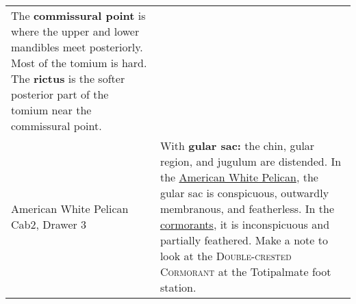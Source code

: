 \documentclass[10pt]{article}
\newif\ifprintkey
\newcommand{\PrintKey}[1]{\ifprintkey{\textbf{#1}}\fi}
\begin{document}
\begin{longtable}{@{}C{0.45\textwidth}L{0.45\textwidth}@{}}
The \textbf{commissural point} is where the upper and lower mandibles meet posteriorly. Most of the tomium is hard. The \textbf{rictus} is the softer posterior part of the tomium near the commissural point.\\ [2.5cm]
%
\PrintKey{American White Pelican \newline Cab2, Drawer 3} & 
With \textbf{gular sac:} the chin, gular region, and jugulum are distended. In the \href{https://www.allaboutbirds.org/guide/browse/taxonomy/Pelecanidae}{American White Pelican}, the gular sac is conspicuous, outwardly membranous, and featherless. In the \href{https://www.allaboutbirds.org/guide/browse/taxonomy/Phalacrocoracidae}{cormorants}, it is inconspicuous and partially feathered. Make a note to look at the \textsc{Double-crested Cormorant} at the Totipalmate foot station. \\ [2.5cm]



\end{longtable}
\end{document}
